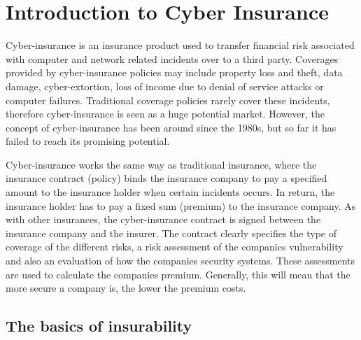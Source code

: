 \chapter{Introduction to Cyber Insurance}
\label{chp:introductionToCyberInsurance} 

Cyber-insurance is an insurance product used to transfer financial risk
associated with computer and network related incidents over to a third party.
 Coverages provided by cyber-insurance policies may include property loss and
theft, data damage, cyber-extortion, loss of income due to denial of service attacks or computer failures. \cite{washingtonpaper}
Traditional coverage policies rarely cover these incidents, therefore cyber-insurance is seen as a huge potential market. However, the concept of cyber-insurance has been around since the 1980s, but so far it has failed to reach its promising potential. 
  
 
Cyber-insurance works the same way as traditional insurance, where the insurance contract (policy) binds the insurance company to pay a specified amount to the insurance holder when certain incidents occurs. In return, the insurance holder has to pay a fixed sum (premium) to the insurance company. \cite{robinson2012incentives}
    As with other insurances, the cyber-insurance contract is signed between the insurance company and the insurer. The contract clearly specifies the type of coverage of the different risks, a risk assessment of the companies vulnerability and also an evaluation of how the companies security systems. These assessments are used to calculate the companies premium. \cite{robinson2012incentives} Generally, this will mean that the more secure a company is, the lower the premium costs.  

\section{The basics of insurability}


